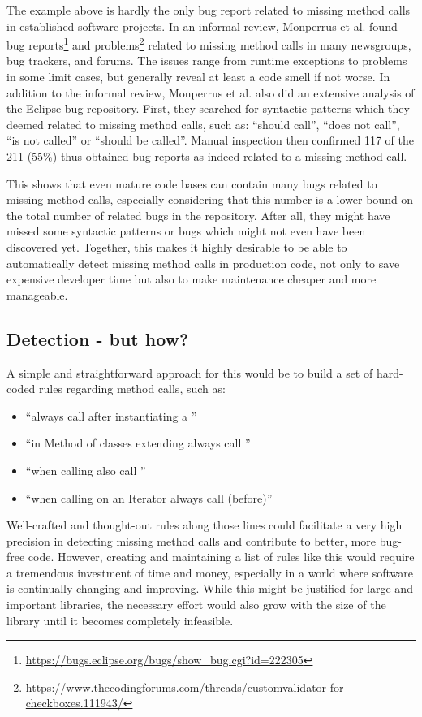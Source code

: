 The example above is hardly the only bug report related to missing method calls in established software projects.
In an informal review, Monperrus et al. found bug reports\footnote{\url{https://bugs.eclipse.org/bugs/show_bug.cgi?id=222305}} and problems\footnote{\url{https://www.thecodingforums.com/threads/customvalidator-for-checkboxes.111943/}} related to missing method calls in many newsgroups, bug trackers, and forums.
The issues range from runtime exceptions to problems in some limit cases, but generally reveal at least a code smell if not worse.
In addition to the informal review, Monperrus et al. \cite{monperrus2013detecting} also did an extensive analysis of the Eclipse bug repository.
First, they searched for syntactic patterns which they deemed related to missing method calls, such as: ``should call'', ``does not call'', ``is not called'' or ``should be called''.
Manual inspection then confirmed 117 of the 211 (55\%) thus obtained bug reports as indeed related to a missing method call.

This shows that even mature code bases can contain many bugs related to missing method calls, especially considering that this number is a lower bound on the total number of related bugs in the repository.
After all, they might have missed some syntactic patterns or bugs which might not even have been discovered yet.
Together, this makes it highly desirable to be able to automatically detect missing method calls in production code, not only to save expensive developer time but also to make maintenance cheaper and more manageable.

\subsection{Detection - but how?}
A simple and straightforward approach for this would be to build a set of hard-coded rules regarding method calls, such as:
\begin{itemize}
    \item ``always call  after instantiating a ''
    \item ``in Method  of classes extending  always call ''
    \item ``when calling  also call ''
    \item ``when calling  on an Iterator always call  (before)''
\end{itemize}
Well-crafted and thought-out rules along those lines could facilitate a very high precision in detecting missing method calls and contribute to better, more bug-free code.
However, creating and maintaining a list of rules like this would require a tremendous investment of time and money, especially in a world where software is continually changing and improving.
While this might be justified for large and important libraries, the necessary effort would also grow with the size of the library until it becomes completely infeasible.

